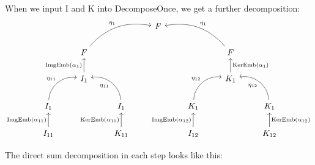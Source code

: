 When we input I and K into DecomposeOnce, we get a further decomposition:
\[
\begin{tikzcd}
                                                 &                                                &                                                  & F &                                                  &                                                 &                                                   \\
                                                 & F \arrow[rru, "\eta_{1}", bend left]           &                                                  &   &                                                  & F \arrow[llu, "\eta_{1}"', bend right]          &                                                   \\
                                                 & I_{1} \arrow[u, "\mathrm{ImgEmb}(\alpha_{1})"] &                                                  &   &                                                  & K_{1} \arrow[u, "\mathrm{KerEmb}(\alpha_{1})"'] &                                                   \\
I_{1} \arrow[ru, "\eta_{11}", bend left=49]      &                                                & I_{1} \arrow[lu, "\eta_{11}", bend right=49]     &   & K_{1} \arrow[ru, "\eta_{12}", bend left=49]      &                                                 & K_{1} \arrow[lu, "\eta_{12}", bend right=49]      \\
I_{11} \arrow[u, "\mathrm{ImgEmb}(\alpha_{11})"] &                                                & K_{11} \arrow[u, "\mathrm{KerEmb}(\alpha_{11})"] &   & I_{12} \arrow[u, "\mathrm{ImgEmb}(\alpha_{12})"] &                                                 & K_{12} \arrow[u, "\mathrm{KerEmb}(\alpha_{12})"']
\end{tikzcd}
\]

The direct sum decomposition in each step looks like this:

